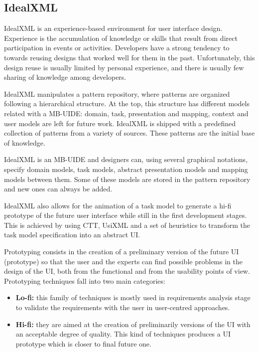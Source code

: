 \subsection{IdealXML}
\label{subsection:IdealXML}

IdealXML\cite{IdealXml_An_Interaction_Design_Tool, idealxml2} is an experience-based environment for user interface design. Experience is the accumulation of knowledge or skills that result from direct participation in events or activities. Developers have a strong tendency to towards reusing designs that worked well for them in the past. Unfortunately, this design reuse is usually limited by personal experience, and there is usually few sharing of knowledge among developers.

IdealXML manipulates a pattern repository, where patterns are organized following a hierarchical structure. At the top, this structure has different models related with a MB-UIDE: domain, task, presentation and mapping, context and user models are left for future work. IdealXML is shipped with a predefined collection of patterns from a variety of sources. These patterns are the initial base of knowledge.

IdealXML is an MB-UIDE and designers can, using several graphical notations, specify domain models, task models, abstract presentation models and mapping models between them. Some of these models are stored in the pattern repository and new ones can always be added.

IdealXML also allows for the animation of a task model to generate a hi-fi prototype of the future user interface while still in the first development stages. This is achieved by using CTT, UsiXML and a set of heuristics to transform the task model specification into an abstract UI.

Prototyping consists in the creation of a preliminary version of the future UI (prototype) so that the user and the experts can find possible problems in the design of the UI, both from the functional and from the usability points of view. Prototyping techniques fall into two main categories:
\begin{itemize}
\item \textbf{Lo-fi:} this family of techniques is mostly used in requirements analysis stage to validate the requirements with the user in user-centred approaches.

\item \textbf{Hi-fi:} they are aimed at the creation of preliminarily versions of the UI with an acceptable degree of quality. This kind of techniques produces a UI prototype which is closer to final future one.
\end{itemize}

